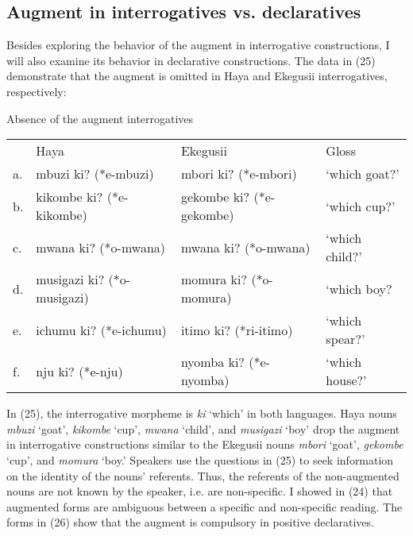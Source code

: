 \documentclass[output=paper]{langscibook}
\begin{document}
\subsection{Augment in interrogatives vs. declaratives}\label{sec:choti:5.2} 
Besides exploring the behavior of the augment in interrogative constructions, I will also examine its behavior in declarative constructions.  The data in (25) demonstrate that the augment is omitted in Haya and Ekegusii interrogatives, respectively:  

\begin{exe}
\ex Absence of the augment interrogatives\\
\label{hayagusii25}
\begin{tabular}{llll}
        &     Haya		&		Ekegusii	&		Gloss	\\	 
a. &	mbuzi ki? (*e-mbuzi)	&	mbori ki? (*e-mbori) &		‘which goat?’    \\		
b. &	kikombe ki? (*e-kikombe) &	gekombe ki? (*e-gekombe) &	‘which cup?’\\
c. &	mwana ki? (*o-mwana) &	mwana ki? (*o-mwana) &	‘which child?’	\\
d. &	musigazi ki? (*o-musigazi) &	momura ki? (*o-momura) &	‘which boy?\\
e. &	ichumu ki? (*e-ichumu) &	itimo ki? (*ri-itimo)	&	‘which spear?’ \\
f. &	nju ki?	(*e-nju)	&	nyomba ki? (*e-nyomba)&	‘which house?’ \\

\end{tabular}
\end{exe}
In (25), the interrogative morpheme is \textit{ki} ‘which’ in both languages. Haya nouns \textit{mbuzi} ‘goat’, \textit{kikombe} ‘cup’, \textit{mwana} ‘child’, and \textit{musigazi} ‘boy’ drop the augment in interrogative constructions similar to the Ekegusii nouns \textit{mbori} ‘goat’, \textit{gekombe} ‘cup’, and \textit{momura} ‘boy.' Speakers use the questions in (25) to seek information on the identity of the nouns’ referents. Thus, the referents of the non-augmented nouns are not known by the speaker, i.e. are non-specific. I showed in (24) that augmented forms are ambiguous between a specific and non-specific reading. The forms in (26) show that the augment is compulsory in positive declaratives. 
\end{document}
